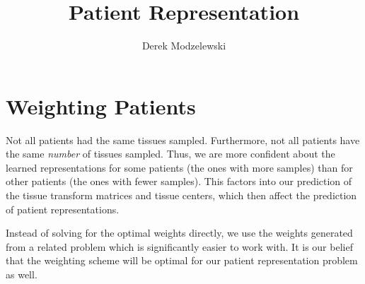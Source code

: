 \documentclass{article}
\title{Patient Representation}
\author{Derek Modzelewski}
\begin{document}
\maketitle

\section{Weighting Patients}
Not all patients had the same tissues sampled. Furthermore, not all patients have the same {\it number} of tissues sampled. Thus, we are more confident about the learned representations for some patients (the ones with more samples) than for other patients (the ones with fewer samples). This factors into our prediction of the tissue transform matrices and tissue centers, which then affect the prediction of patient representations.

Instead of solving for the optimal weights directly, we use the weights generated from a related problem which is significantly easier to work with. It is our belief that the weighting scheme will be optimal for our patient representation problem as well.
\end{document}
